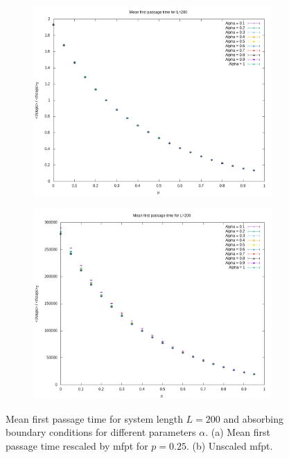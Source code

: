 \documentclass[]{scrartcl}
\begin{document}
 \begin{figure}[!hbt]
\centering
\begin{subfigure}{0.45\textwidth}
 \includegraphics[width=\textwidth]{./fig/latt/alpha/L=200/fpt.png}
\end{subfigure}
\begin{subfigure}{0.45\textwidth}
 \includegraphics[width=\textwidth]{./fig/latt/alpha/L=200/fpt2.png}
\end{subfigure}
\caption{Mean first passage time for system length $L = 200$ and absorbing boundary conditions for different parameters $\alpha$. (a) Mean first passage time rescaled by mfpt for $p = 0.25$. (b) Unscaled mfpt.} 
\label{fig:latt-alpha-fpts200}
\end{figure}
\end{document}
